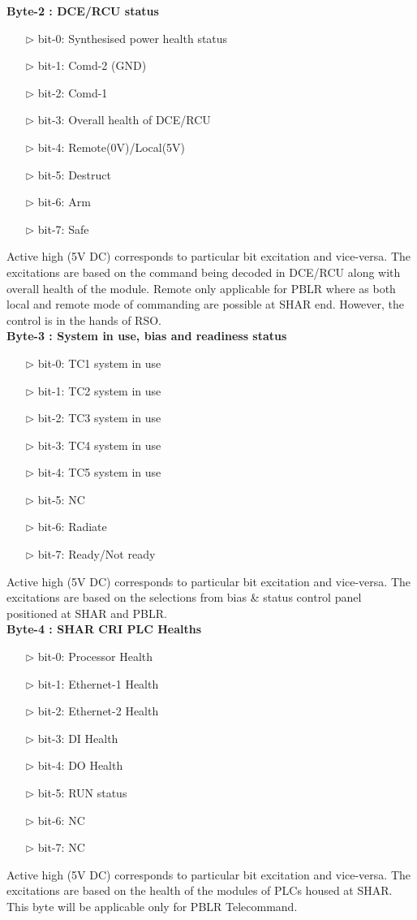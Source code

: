 \textbf{Byte-2 : DCE/RCU status}
\begin{enumerate}
	\item [$\rhd$] bit-0: Synthesised power health status
	\item [$\rhd$] bit-1: Comd-2 (GND)
	\item [$\rhd$] bit-2: Comd-1
	\item [$\rhd$] bit-3: Overall health of DCE/RCU
	\item [$\rhd$] bit-4: Remote(0V)/Local(5V) 
	\item [$\rhd$] bit-5: Destruct
	\item [$\rhd$] bit-6: Arm
	\item [$\rhd$] bit-7: Safe
\end{enumerate}
Active high (5V DC) corresponds to particular bit excitation and vice-versa. The excitations are based on the command being decoded in DCE/RCU along with overall health of the module. Remote only applicable for PBLR where as both local and remote mode of commanding are possible at SHAR end. However, the control is in the hands of RSO.\\

\textbf{Byte-3 : System in use, bias and readiness status}
\begin{enumerate}
	\item [$\rhd$] bit-0: TC1 system in use
	\item [$\rhd$] bit-1: TC2 system in use
	\item [$\rhd$] bit-2: TC3 system in use
	\item [$\rhd$] bit-3: TC4 system in use
	\item [$\rhd$] bit-4: TC5 system in use
	\item [$\rhd$] bit-5: NC
	\item [$\rhd$] bit-6: Radiate
	\item [$\rhd$] bit-7: Ready/Not ready
\end{enumerate}
Active high (5V DC) corresponds to particular bit excitation and vice-versa. The excitations are based on the selections from bias \& status control panel positioned at SHAR and PBLR.  \\

\textbf{Byte-4 : SHAR CRI PLC Healths }
\begin{enumerate}
	\item [$\rhd$] bit-0: Processor Health
	\item [$\rhd$] bit-1: Ethernet-1 Health
	\item [$\rhd$] bit-2: Ethernet-2 Health
	\item [$\rhd$] bit-3: DI Health
	\item [$\rhd$] bit-4: DO Health
	\item [$\rhd$] bit-5: RUN status
	\item [$\rhd$] bit-6: NC
	\item [$\rhd$] bit-7: NC
\end{enumerate}
Active high (5V DC) corresponds to particular bit excitation and vice-versa. The excitations are based on the health of the modules of PLCs housed at SHAR. This byte will be applicable only for PBLR Telecommand.\\

